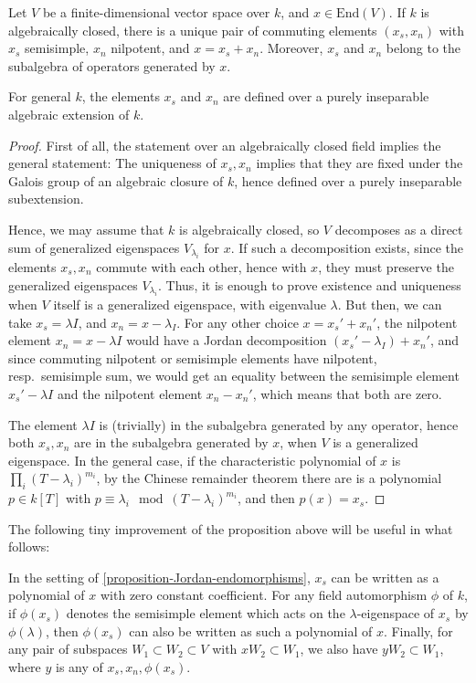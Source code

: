 \begin{proposition}
\label{proposition-Jordan-endomorphisms}
 Let $V$ be a finite-dimensional vector space over $k$, and $x\in \text{End}(V)$. If $k$ is algebraically closed, there is a unique pair of commuting elements $(x_s, x_n)$ with $x_s$ semisimple, $x_n$ nilpotent, and $x=x_s+x_n$. Moreover, $x_s$ and $x_n$ belong to the subalgebra of operators generated by $x$.
 
 For general $k$, the elements $x_s$ and $x_n$ are defined over a purely inseparable algebraic extension of $k$. 
\end{proposition}

\begin{proof}
 First of all, the statement over an algebraically closed field implies the general statement: The uniqueness of $x_s, x_n$ implies that they are fixed under the Galois group of an algebraic closure of $k$, hence defined over a purely inseparable subextension.
 
 Hence, we may assume that $k$ is algebraically closed, so $V$ decomposes as a direct sum of generalized eigenspaces $V_{\lambda_i}$ for $x$. If such a decomposition exists, since the elements $x_s, x_n$ commute with each other, hence with $x$, they must preserve the generalized eigenspaces $V_{\lambda_i}$. Thus, it is enough to prove existence and uniqueness when $V$ itself is a generalized eigenspace, with eigenvalue $\lambda$. But then, we can take $x_s=\lambda I$, and $x_n = x - \lambda_I$. For any other choice $x=x_s'+x_n'$, the nilpotent element $x_n=x-\lambda I$ would have a Jordan decomposition $(x_s'-\lambda_I) + x_n'$, and since commuting nilpotent or semisimple elements have nilpotent, resp.\ semisimple sum, we would get an equality between the semisimple element $x_s'-\lambda I$ and the nilpotent element $x_n-x_n'$, which means that both are zero.
 
 The element $\lambda I$ is (trivially) in the subalgebra generated by any operator, hence both $x_s, x_n$ are in the subalgebra generated by $x$, when $V$ is a generalized eigenspace. In the general case, if the characteristic polynomial of $x$ is $\prod_i (T-\lambda_i)^{m_i}$, by the Chinese remainder theorem there are is a polynomial $p\in k[T]$ with $p\equiv \lambda_i \mod (T-\lambda_i)^{m_i}$, and then $p(x)=x_s$. 
\end{proof}

The following tiny improvement of the proposition above will be useful in what follows:

\begin{lemma}
\label{lemma-Jordan-extension}
In the setting of \ref{proposition-Jordan-endomorphisms}, $x_s$ can be written as a polynomial of $x$ with zero constant coefficient. For any field automorphism $\phi$ of $k$, if $\phi(x_s)$ denotes the semisimple element which acts on the $\lambda$-eigenspace of $x_s$ by $\phi(\lambda)$, then $\phi(x_s)$ can also be written as such a polynomial of $x$. Finally, for any pair of subspaces $W_1\subset W_2\subset V$ with $xW_2\subset W_1$, we also have $yW_2\subset W_1$, where $y$ is any of $x_s, x_n, \phi(x_s)$.
\end{lemma}

